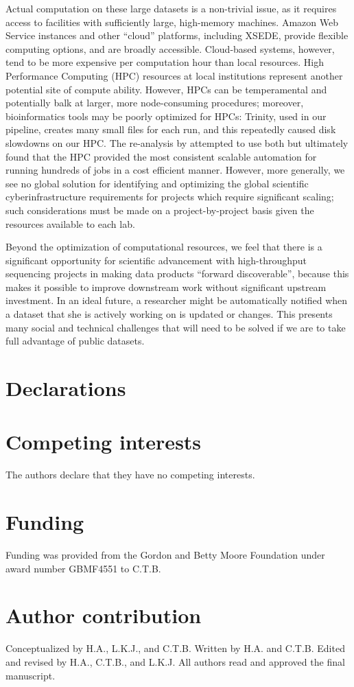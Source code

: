 \documentclass[a4paper,num-refs]{oup-contemporary}
\begin{document}
Actual computation on these large datasets is a non-trivial issue, as
it requires access to facilities with sufficiently large, high-memory
machines.  Amazon Web Service instances and other ``cloud'' platforms,
including XSEDE, provide flexible computing options, and are broadly
accessible. Cloud-based systems, however, tend to be more expensive
per computation hour than local resources. High Performance Computing
(HPC) resources at local institutions represent another potential site
of compute ability.  However, HPCs can be temperamental and
potentially balk at larger, more node-consuming procedures; moreover,
bioinformatics tools may be poorly optimized for HPCs: Trinity, used in
our pipeline, creates many small files for each run, and this
repeatedly caused disk slowdowns on our HPC.  The re-analysis by
\citet{Johnson2018} attempted to use both but ultimately
found that the HPC provided the most consistent scalable automation
for running hundreds of jobs in a cost efficient manner.  However,
more generally, we see no global solution for identifying and
optimizing the global scientific cyberinfrastructure requirements for
projects which require significant scaling; such considerations must
be made on a project-by-project basis given the resources available to
each lab.

Beyond the optimization of computational resources, we feel that there
is a significant opportunity for scientific advancement with
high-throughput sequencing projects in making data products ``forward
discoverable'', because this makes it possible to improve downstream
work without significant upstream investment.  In an ideal future, a
researcher might be automatically notified when a dataset that she is
actively working on is updated or changes. This presents many social
and technical challenges that will need to be solved if we are to take
full advantage of public datasets.

\section{Declarations}
\section{Competing interests}
The authors declare that they have no competing interests.
\section{Funding}
Funding was provided from the Gordon and Betty Moore Foundation under award number GBMF4551 to C.T.B.
\section{Author contribution}
Conceptualized by H.A., L.K.J., and C.T.B. Written by H.A. and C.T.B. Edited and revised by H.A., C.T.B., and L.K.J. All authors read and approved the final manuscript.



\end{document}
